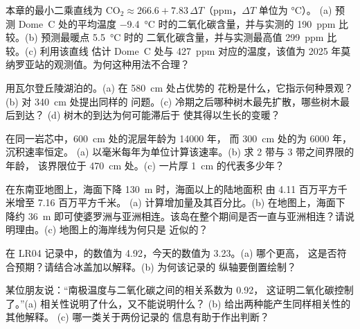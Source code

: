 \begin{exercise}[$\star\star$]\label{exo:g12:past-climates:6}
本章的最小二乘直线为 $\mathrm{CO_2} \approx 266.6 +
7.83\,\Delta T$（ppm，$\Delta T$ 单位为 \unit{\degreeCelsius}）。
(a) 预测
Dome~C 处的平均温度 \qty{-9.4}{\degreeCelsius} 时的二氧化碳含量，并与实测的
\qty{190}{ppm} 比较。(b) 预测最暖点 \qty{+5.5}{\degreeCelsius} 时的
二氧化碳含量，并与实测最高值 \qty{299}{ppm} 比较。(c) 利用该直线
估计 Dome~C 处与 \qty{427}{ppm} 对应的温度，该值为
2025 年莫纳罗亚站的观测值。为何这种用法不合理？
\end{exercise}

\begin{exercise}[$\star\star$]\label{exo:g12:past-climates:7}
用瓦尔登丘陵湖泊的。(a) 在 \qty{580}{cm} 处占优势的
花粉是什么，它指示何种景观？(b) 对 \qty{340}{cm} 处提出同样的
问题。(c) 冷期之后哪种树木最先扩散，哪些树木最后到达？
(d) 树木的到达为何可能滞后于
使其得以生长的变暖？
\end{exercise}

\begin{exercise}[$\star\star$]\label{exo:g12:past-climates:8}
在同一岩芯中，\qty{600}{cm} 处的泥层年龄为 \num{14000} 年，
而 \qty{300}{cm} 处的为 \num{6000} 年，沉积速率恒定。
(a) 以毫米每年为单位计算该速率。(b) 求 2 带与 3 带之间界限的年龄，
该界限位于 \qty{470}{cm} 处。(c) 一片厚
\qty{1}{cm} 的代表多少年？
\end{exercise}

\begin{exercise}[$\star\star$]\label{exo:g12:past-climates:9}
在东南亚地图上，海面下降 \qty{130}{m} 时，海面以上的陆地面积
由 4.11 百万平方千米增至 7.16 百万平方千米。
(a) 计算增加量及其百分比。(b) 在地图上，海面下降约
\qty{36}{m} 即可使婆罗洲与亚洲相连。该岛在整个期间是否一直与亚洲相连？请说明理由。(c) 地图上的海岸线为何只是
近似的？
\end{exercise}

\begin{exercise}[$\star\star$]\label{exo:g12:past-climates:10}
在 LR04 记录中，的数值为
\qty{4.92}{\permil}，今天的数值为 \qty{3.23}{\permil}。(a) 哪个更高，
这是否符合预期？请结合冰盖加以解释。(b) 为何该记录的
纵轴要倒置绘制？
\end{exercise}

\begin{exercise}[$\star\star$]\label{exo:g12:past-climates:11}
某位朋友说：“南极温度与二氧化碳之间的相关系数为 0.92，
这证明二氧化碳控制了。”(a) 相关性说明了什么，又不能说明什么？
(b) 给出两种能产生同样相关性的其他解释。
(c) 哪一类关于两份记录的
信息有助于作出判断？
\end{exercise}

